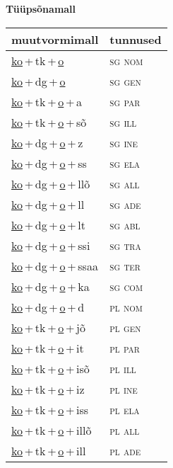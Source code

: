 
\vspace{1.8em}
\begin{minipage}{\textwidth}
\textbf{Tüüpsõnamall \,}\\

\begin{sideways}
\begin{tabular}{l l}
muutvormimall & tunnused \\
\hline
\underline{ko}\,+\,tk\,+\,\underline{o} & \textsc{ sg nom } \\
\underline{ko}\,+\,dg\,+\,\underline{o} & \textsc{ sg gen } \\
\underline{ko}\,+\,tk\,+\,\underline{o}\,+\,a & \textsc{ sg par } \\
\underline{ko}\,+\,tk\,+\,\underline{o}\,+\,sõ & \textsc{ sg ill } \\
\underline{ko}\,+\,dg\,+\,\underline{o}\,+\,z & \textsc{ sg ine } \\
\underline{ko}\,+\,dg\,+\,\underline{o}\,+\,ss & \textsc{ sg ela } \\
\underline{ko}\,+\,dg\,+\,\underline{o}\,+\,llõ & \textsc{ sg all } \\
\underline{ko}\,+\,dg\,+\,\underline{o}\,+\,ll & \textsc{ sg ade } \\
\underline{ko}\,+\,dg\,+\,\underline{o}\,+\,lt & \textsc{ sg abl } \\
\underline{ko}\,+\,dg\,+\,\underline{o}\,+\,ssi & \textsc{ sg tra } \\
\underline{ko}\,+\,dg\,+\,\underline{o}\,+\,ssaa & \textsc{ sg ter } \\
\underline{ko}\,+\,dg\,+\,\underline{o}\,+\,ka & \textsc{ sg com } \\
\underline{ko}\,+\,dg\,+\,\underline{o}\,+\,d & \textsc{ pl nom } \\
\underline{ko}\,+\,tk\,+\,\underline{o}\,+\,jõ & \textsc{ pl gen } \\
\underline{ko}\,+\,tk\,+\,\underline{o}\,+\,it & \textsc{ pl par } \\
\underline{ko}\,+\,tk\,+\,\underline{o}\,+\,isõ & \textsc{ pl ill } \\
\underline{ko}\,+\,tk\,+\,\underline{o}\,+\,iz & \textsc{ pl ine } \\
\underline{ko}\,+\,tk\,+\,\underline{o}\,+\,iss & \textsc{ pl ela } \\
\underline{ko}\,+\,tk\,+\,\underline{o}\,+\,illõ & \textsc{ pl all } \\
\underline{ko}\,+\,tk\,+\,\underline{o}\,+\,ill & \textsc{ pl ade } \\

\end{tabular}
\end{sideways}
\end{minipage}
